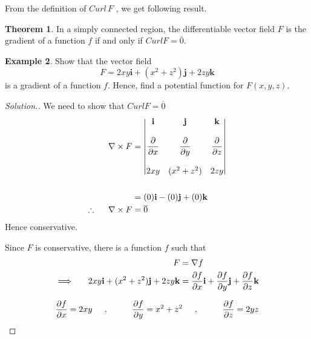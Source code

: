 \documentclass[11pt,a4paper]{article}
\theoremstyle{definition}
\newtheorem{thm}{Theorem}[subsection]
\newtheorem{exa}[thm]{Example}
\newenvironment{solution}
  {\renewcommand{\qedsymbol}{}\begin{proof}[\textit{Solution}.]}
  {\end{proof}}
\begin{document}
From the definition of $Curl\, F$ , we get following result.


\begin{thm}


In a simply connected region, the differentiable vector field $F$ is the gradient of a function $f$ if and only if $Curl F = \overline{0}$.
\end{thm}


\begin{exa}


Show that the vector field
$$ F = 2xy\textbf{i} + (x^2 + z^2)\textbf{j} + 2zy\textbf{k}$$ is a gradient of a function $f$. Hence, find a potential function for $F(x,y,z)$.
\end{exa}


\begin{solution}


We need to show that $Curl F = \overline{0}$
\begin{align*}
\nabla \times F &  = \begin{vmatrix}
\textbf{i} & \textbf{j} & \textbf{k}\\\\
\dfrac{\partial}{\partial x} & \dfrac{\partial}{\partial y} & \dfrac{\partial}{\partial z}\\\\
2xy & (x^2+ z^2) & 2zy\\
\end{vmatrix}\\\\
& = (0)\textbf{i} - (0)\textbf{j} + (0)\textbf{k}\\
\therefore \hspace{0.5cm} \nabla \times F &= \overline{0}
\end{align*}
Hence conservative.


Since $F$ is conservative, there is a function $f$ such that 
\begin{align*}
F & = \nabla f\\
\implies\hspace{0.5cm} 2xy\textbf{i} + (x^2+z^2)\textbf{j} +2zy\textbf{k} & = \frac{\partial f}{\partial x}\textbf{i} + \frac{\partial f}{\partial y}\textbf{j} + \frac{\partial f}{\partial z} \textbf{k}
\end{align*}

$$\frac{\partial f}{\partial x} = 2xy\hspace{0.5cm},\hspace{1cm} \frac{\partial f}{\partial y}= x^2+z^2\hspace{0.5cm}, \hspace{1cm} \frac{\partial f}{\partial z} = 2yz$$


\end{solution}
\end{document}
